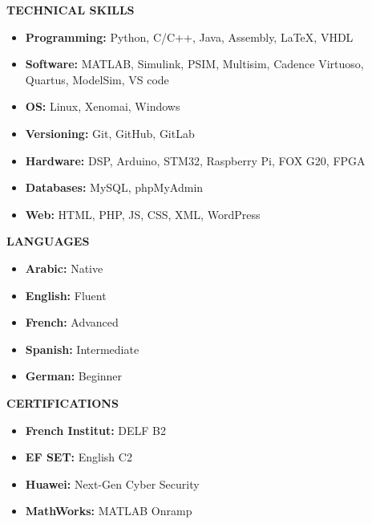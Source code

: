 \documentclass{article}
\begin{document}
\begin{minipage}[t]{0.3\textwidth}
\raggedright
{\color{sectionteal}\large\bfseries TECHNICAL SKILLS} \\[0.05em]
\begin{itemize}[leftmargin=*, itemsep=0.15em, topsep=0pt, parsep=0pt]
\item \textbf{Programming:} Python, C/C++, Java, Assembly, LaTeX, VHDL
\vspace{0.5em}
\item \textbf{Software:} MATLAB, Simulink, PSIM, Multisim, Cadence Virtuoso, Quartus, ModelSim, VS code
\vspace{0.5em}

\item \textbf{OS:} Linux, Xenomai, Windows
\vspace{0.5em}
\item \textbf{Versioning:} Git, GitHub, GitLab
\vspace{0.5em}
\item \textbf{Hardware:} DSP, Arduino, STM32, Raspberry Pi, FOX G20, FPGA
\vspace{0.5em}
\item \textbf{Databases:} MySQL, phpMyAdmin
\vspace{0.5em}
\item \textbf{Web:} HTML, PHP, JS, CSS, XML, WordPress
\end{itemize}

\vspace{2em}
{\color{sectionteal}\large\bfseries LANGUAGES} \\[0.05em]
\begin{itemize}[leftmargin=*, itemsep=0.15em, topsep=0pt, parsep=0pt]
\item \textbf{Arabic:} Native
\item \textbf{English:} Fluent
\item \textbf{French:} Advanced
\item \textbf{Spanish:} Intermediate
\item \textbf{German:} Beginner
\end{itemize}

\vspace{2em}
{\color{sectionteal}\large\bfseries CERTIFICATIONS} \\[0.05em]
\begin{itemize}[leftmargin=*, itemsep=0.15em, topsep=0pt, parsep=0pt]
\item \textbf{French Institut:} DELF B2
\item \textbf{EF SET:} English C2
\item \textbf{Huawei:} Next-Gen Cyber Security
\item \textbf{MathWorks:} MATLAB Onramp
\end{itemize}


\end{minipage}
\end{document}

